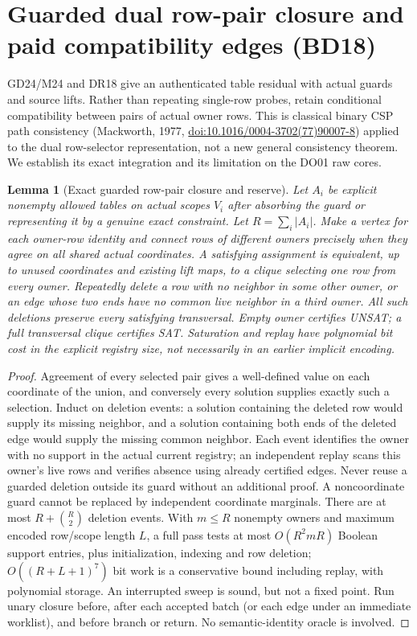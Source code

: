 \documentclass[11pt]{article}
\newtheorem{lemma}[theorem]{Lemma}
\begin{document}
\section{Guarded dual row-pair closure and paid compatibility edges (BD18)}\label{sec:bd18}
GD24/M24 and DR18 give an authenticated table residual with actual guards and source lifts. Rather than repeating single-row probes, retain conditional compatibility between pairs of actual owner rows. This is classical binary CSP path consistency (Mackworth, 1977, \href{https://doi.org/10.1016/0004-3702(77)90007-8}{doi:10.1016/0004-3702(77)90007-8}) applied to the dual row-selector representation, not a new general consistency theorem. We establish its exact integration and its limitation on the DO01 raw cores.
\begin{lemma}[Exact guarded row-pair closure and reserve]\label{lem:bd18-pairs}
Let $A_i$ be explicit nonempty allowed tables on actual scopes $V_i$ after absorbing the guard or representing it by a genuine exact constraint. Let $R=\sum_i|A_i|$. Make a vertex for each owner-row identity and connect rows of different owners precisely when they agree on all shared actual coordinates. A satisfying assignment is equivalent, up to unused coordinates and existing lift maps, to a clique selecting one row from every owner. Repeatedly delete a row with no neighbor in some other owner, or an edge whose two ends have no common live neighbor in a third owner. All such deletions preserve every satisfying transversal. Empty owner certifies UNSAT; a full transversal clique certifies SAT. Saturation and replay have polynomial bit cost in the explicit registry size, not necessarily in an earlier implicit encoding.
\end{lemma}
\begin{proof}
Agreement of every selected pair gives a well-defined value on each coordinate of the union, and conversely every solution supplies exactly such a selection. Induct on deletion events: a solution containing the deleted row would supply its missing neighbor, and a solution containing both ends of the deleted edge would supply the missing common neighbor. Each event identifies the owner with no support in the actual current registry; an independent replay scans this owner's live rows and verifies absence using already certified edges. Never reuse a guarded deletion outside its guard without an additional proof. A noncoordinate guard cannot be replaced by independent coordinate marginals. There are at most $R+\binom R2$ deletion events. With $m\le R$ nonempty owners and maximum encoded row/scope length $L$, a full pass tests at most $O(R^2mR)$ Boolean support entries, plus initialization, indexing and row deletion; $O((R+L+1)^7)$ bit work is a conservative bound including replay, with polynomial storage. An interrupted sweep is sound, but not a fixed point. Run unary closure before, after each accepted batch (or each edge under an immediate worklist), and before branch or return. No semantic-identity oracle is involved.
\end{proof}
\end{document}
